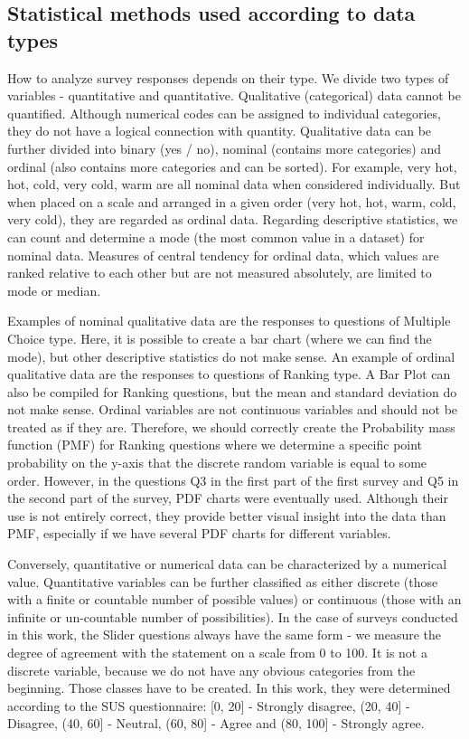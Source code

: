 \documentclass[a4paper,10pt,twoside]{article}
\begin{document}
\subsection{Statistical methods used according to data types}

How to analyze survey responses depends on their type. We divide two types of variables - quantitative and quantitative. Qualitative (categorical) data cannot be quantified. Although numerical codes can be assigned to individual categories, they do not have a logical connection with quantity. Qualitative data can be further divided into binary (yes / no), nominal (contains more categories) and ordinal (also contains more categories and can be sorted). For example, very hot, hot, cold, very cold, warm are all nominal data when considered individually. But when placed on a scale and arranged in a given order (very hot, hot, warm, cold, very cold), they are regarded as ordinal data. Regarding descriptive statistics, we can count and determine a mode (the most common value in a dataset) for nominal data. Measures of central tendency for ordinal data, which values are ranked relative to each other but are not measured absolutely, are limited to mode or median. 

Examples of nominal qualitative data are the responses to questions of Multiple Choice type. Here, it is possible to create a bar chart (where we can find the mode), but other descriptive statistics do not make sense. An example of ordinal qualitative data are the responses to questions of Ranking type. A Bar Plot can also be compiled for Ranking questions, but the mean and standard deviation do not make sense. Ordinal variables are not continuous variables and should not be treated as if they are. Therefore, we should correctly create the Probability mass function (PMF) for Ranking questions where we determine a specific point probability on the y-axis that the discrete random variable is equal to some order. However, in the questions Q3 in the first part of the first survey and Q5 in the second part of the survey, PDF charts were eventually used. Although their use is not entirely correct, they provide better visual insight into the data than PMF, especially if we have several PDF charts for different variables.

Conversely, quantitative or numerical data can be characterized by a numerical value. Quantitative variables can be further classified as either discrete (those with a finite or countable number of possible values) or continuous (those with an infinite or un-countable number of possibilities). In the case of surveys conducted in this work, the Slider questions always have the same form - we measure the degree of agreement with the statement on a scale from 0 to 100. It is not a discrete variable, because we do not have any obvious categories from the beginning. Those classes have to be created. In this work, they were determined according to the SUS questionnaire: [0, 20] - Strongly disagree, (20, 40] - Disagree, (40, 60] - Neutral, (60, 80] - Agree and (80, 100] - Strongly agree.
\end{document}
